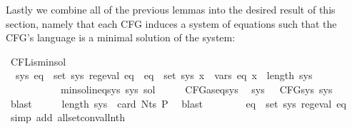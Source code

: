 \begin{isabellebody}
%
\begin{isamarkuptext}%
Lastly we combine all of the previous lemmas into the desired result of this section, namely
that each CFG induces a system of equations such that the CFG's language is a minimal solution of
the system:%
\end{isamarkuptext}\isamarkuptrue%
\isamarkupfalse%
\ CFL{\isacharunderscore}{\kern0pt}is{\isacharunderscore}{\kern0pt}min{\isacharunderscore}{\kern0pt}sol{\isacharcolon}{\kern0pt}\isanewline
\ \ {\isachardoublequoteopen}{\isasymexists}sys{\isachardot}{\kern0pt}\ {\isacharparenleft}{\kern0pt}{\isasymforall}eq\ {\isasymin}\ set\ sys{\isachardot}{\kern0pt}\ reg{\isacharunderscore}{\kern0pt}eval\ eq{\isacharparenright}{\kern0pt}\ {\isasymand}\ {\isacharparenleft}{\kern0pt}{\isasymforall}eq\ {\isasymin}\ set\ sys{\isachardot}{\kern0pt}\ {\isasymforall}x\ {\isasymin}\ vars\ eq{\isachardot}{\kern0pt}\ x\ {\isacharless}{\kern0pt}\ length\ sys{\isacharparenright}{\kern0pt}\isanewline
\ \ \ \ \ \ \ \ \ \ {\isasymand}\ min{\isacharunderscore}{\kern0pt}sol{\isacharunderscore}{\kern0pt}ineq{\isacharunderscore}{\kern0pt}sys\ sys\ sol{\isachardoublequoteclose}\isanewline
%
\isadelimproof
%
\endisadelimproof
%
\isatagproof
{}\isamarkupfalse%
\ {\isacharminus}{\kern0pt}\isanewline
\ \ \isamarkupfalse%
\ CFG{\isacharunderscore}{\kern0pt}as{\isacharunderscore}{\kern0pt}eq{\isacharunderscore}{\kern0pt}sys\ \isamarkupfalse%
\ sys\ \ {\isacharasterisk}{\kern0pt}{\isacharcolon}{\kern0pt}\ {\isachardoublequoteopen}CFG{\isacharunderscore}{\kern0pt}sys\ sys{\isachardoublequoteclose}\ \isamarkupfalse%
\ blast\isanewline
\ \ \isamarkupfalse%
\ \isamarkupfalse%
\ {\isachardoublequoteopen}length\ sys\ {\isacharequal}{\kern0pt}\ card\ {\isacharparenleft}{\kern0pt}Nts\ P{\isacharparenright}{\kern0pt}{\isachardoublequoteclose}\ \isamarkupfalse%
\ blast\isanewline
\ \ \isamarkupfalse%
\ \isamarkupfalse%
\ {\isacharasterisk}{\kern0pt}\ \isamarkupfalse%
\ {\isachardoublequoteopen}{\isasymforall}eq\ {\isasymin}\ set\ sys{\isachardot}{\kern0pt}\ reg{\isacharunderscore}{\kern0pt}eval\ eq{\isachardoublequoteclose}\ \isamarkupfalse%
\ {\isacharparenleft}{\kern0pt}simp\ add{\isacharcolon}{\kern0pt}\ all{\isacharunderscore}{\kern0pt}set{\isacharunderscore}{\kern0pt}conv{\isacharunderscore}{\kern0pt}all{\isacharunderscore}{\kern0pt}nth{\isacharparenright}{\kern0pt}\isanewline

\end{isabellebody}
